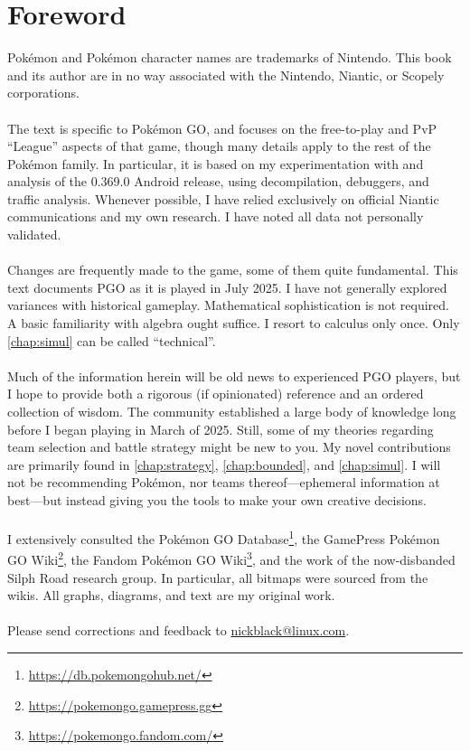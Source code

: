 \clearpage
\chapter{Foreword}

\noindent{}Pokémon and Pokémon character names are trademarks of Nintendo.
This book and its author are in no way associated with the Nintendo, Niantic,
  or Scopely corporations.\\
\\
\noindent{}The text is specific to Pokémon GO, and focuses on the free-to-play and PvP
  ``League'' aspects of that game, though many details
  apply to the rest of the Pokémon family.
In particular, it is based on my experimentation with and analysis of
 the 0.369.0 Android release, using decompilation, debuggers, and
 traffic analysis.
Whenever possible, I have relied exclusively on official Niantic communications
 and my own research.
I have noted all data not personally validated.\\
\\
\noindent{}Changes are frequently made to the game, some of them quite fundamental.
This text documents PGO as it is played in July 2025.
I have not generally explored variances with historical gameplay.
Mathematical sophistication is not required.
A basic familiarity with algebra ought suffice.
I resort to calculus only once.
Only \autoref{chap:simul} can be called ``technical''.\\
\\
\noindent{}Much of the information herein will be old news to experienced
 PGO players, but I hope to provide both a rigorous (if opinionated) reference and an ordered collection of wisdom.
The community established a large body of knowledge long before I
 began playing in March of 2025.
Still, some of my theories regarding team selection and battle strategy might
  be new to you.
My novel contributions are primarily found in \autoref{chap:strategy},
  \autoref{chap:bounded}, and \autoref{chap:simul}.
I will not be recommending Pokémon, nor teams thereof---ephemeral information at best---but
 instead giving you the tools to make your own creative decisions.\\
\\
\noindent{}I extensively consulted the Pokémon GO Database\footnote{\url{https://db.pokemongohub.net/}},
  the GamePress Pokémon GO Wiki\footnote{\url{https://pokemongo.gamepress.gg}},
  the Fandom Pokémon GO Wiki\footnote{\url{https://pokemongo.fandom.com/}},
  and the work of the now-disbanded Silph Road research group.
In particular, all bitmaps were sourced from the wikis.
All graphs, diagrams, and text are my original work.\\
\\
\noindent{}Please send corrections and feedback to 
  \href{mailto:nickblack@linux.com}{nickblack@linux.com}.
